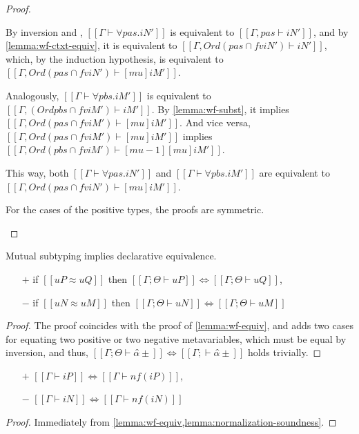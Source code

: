 \begin{proof}
\begin{caseof}
      By inversion and ,
      $[[Γ ⊢ ∀pas.iN']]$ is equivalent to $[[Γ, pas ⊢ iN']]$,
      and by \cref{lemma:wf-ctxt-equiv}, it is equivalent to 
      $[[Γ, Ord ({pas} ∩ fv iN') ⊢ iN']]$,
      which, by the induction hypothesis, is equivalent to
      $[[Γ, Ord ({pas} ∩ fv iN') ⊢ [mu]iM']]$.

      Analogously, $[[Γ ⊢ ∀pbs.iM']]$ is equivalent to
      $[[Γ, (Ord {pbs} ∩ fv iM') ⊢ iM']]$.
      By \cref{lemma:wf-subst}, it implies 
      $[[Γ, Ord ({pas} ∩ fv iM') ⊢ [mu]iM']]$. And vice versa, 
      $[[Γ, Ord ({pas} ∩ fv iM') ⊢ [mu]iM']]$ implies  
      $[[Γ, Ord ({pbs} ∩ fv iM') ⊢ [mu-1][mu]iM']]$.
 
      This way, both $[[Γ ⊢ ∀pas.iN']]$ and $[[Γ ⊢ ∀pbs.iM']]$ are equivalent to
      $[[Γ, Ord ({pas} ∩ fv iN') ⊢ [mu]iM']]$. 
    \item For the cases of the positive types, the proofs are symmetric.
  \end{caseof}
\end{proof}

\begin{lemma}
  \label{lemma:wf-equiv-algo}
  Mutual subtyping implies declarative equivalence.
  \begin{itemize}
  \item[$+$] if $[[uP ≈ uQ]]$ then $[[Γ; Θ ⊢ uP]] \iff [[Γ; Θ ⊢ uQ]]$,
  \item[$-$] if $[[uN ≈ uM]]$ then $[[Γ; Θ ⊢ uN]] \iff [[Γ; Θ ⊢ uM]]$
  \end{itemize}
\end{lemma}
\begin{proof}
  The proof coincides with the proof of \cref{lemma:wf-equiv},
  and adds two cases for equating two positive or two negative metavariables,
  which must be equal by inversion, and thus, 
  $[[Γ; Θ ⊢ α̂±]] \iff [[Γ;  ⊢ α̂±]]$ holds trivially.
\end{proof}

\begin{corollary}
  \label{corollary:wf-nf}
  \hfill
  \begin{itemize}
  \item[$+$] $[[Γ ⊢ iP]] \iff [[Γ ⊢ nf(iP)]]$,
  \item[$-$] $[[Γ ⊢ iN]] \iff [[Γ ⊢ nf(iN)]]$
  \end{itemize}
\end{corollary}
\begin{proof}
  Immediately from \cref{lemma:wf-equiv,lemma:normalization-soundness}.
\end{proof}

